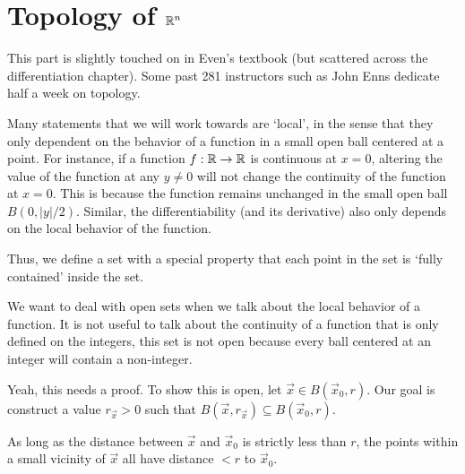 \section{Topology of $\mathbb{R}^n$}
\begin{remark}
    This part is slightly touched on in Even's textbook (but scattered across the differentiation chapter). Some past 281 instructors such as John Enns dedicate half a week on topology.  
\end{remark}
    Many statements that we will work towards are `local', in the sense that they only dependent on the behavior of a function in a small open ball centered at a point. For instance, if a function $f:\mathbb{R}\to\mathbb{R}$ is continuous at $x=0$, altering the value of the function at any $y\neq 0$ will not change the continuity of the function at $x=0$. This is because the function remains unchanged in the small open ball $B(0,|y|/2)$. Similar, the differentiability (and its derivative) also only depends on the local behavior of the function.

    Thus, we define a set with a special property that each point in the set is `fully contained' inside the set.

\begin{remark}
    We want to deal with open sets when we talk about the local behavior of a function. It is not useful to talk about the continuity of a function that is only defined on the integers, this set is not open because every ball centered at an integer will contain a non-integer.
\end{remark}
Yeah, this needs a proof.
To show this is open, let $\vec{x} \in B(\vec{x}_0,r)$. Our goal is construct a value $r_{\vec{x}}>0$ such that $B(\vec{x},r_{\vec{x}})\subseteq B(\vec{x}_0,r)$.

\begin{figure}
    \centering
\end{figure}
As long as the distance between $\vec{x}$ and $\vec{x}_0$ is strictly less than $r$, the points within a small vicinity of $\vec{x}$ all have distance $<r$ to $\vec{x}_0$.

